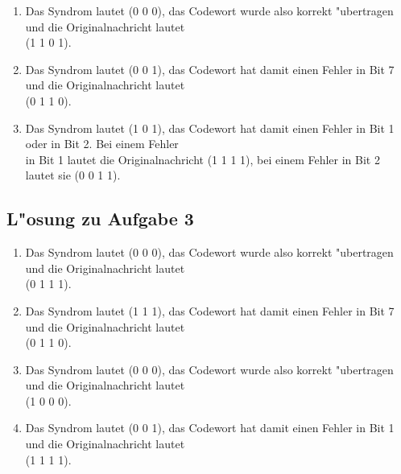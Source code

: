 \documentclass[10pt,oneside,onecolumn,a4paper,german,titlepage]{article}
\begin{document}
\begin{enumerate}
\item Das Syndrom lautet (0 0 0), das Codewort wurde also korrekt "ubertragen und
die Originalnachricht lautet\\
(1 1 0 1).
\item Das Syndrom lautet (0 0 1), das Codewort hat damit einen Fehler in Bit 7 und
die Originalnachricht lautet\\
(0 1 1 0).
\item Das Syndrom lautet (1 0 1), das Codewort hat damit einen Fehler in Bit 1 oder
in Bit 2. Bei einem Fehler\\
in Bit 1 lautet die Originalnachricht (1 1 1 1), bei einem Fehler in Bit 2 lautet
sie (0 0 1 1).
\end{enumerate}

\newpage

\subsection*{L"osung zu Aufgabe 3}
\begin{enumerate}
\item Das Syndrom lautet (0 0 0), das Codewort wurde also korrekt "ubertragen und
die Originalnachricht lautet\\
(0 1 1 1).
\item Das Syndrom lautet (1 1 1), das Codewort hat damit einen Fehler in Bit 7 und
die Originalnachricht lautet\\
(0 1 1 0).
\item Das Syndrom lautet (0 0 0), das Codewort wurde also korrekt "ubertragen und
die Originalnachricht lautet\\
(1 0 0 0).
\item Das Syndrom lautet (0 0 1), das Codewort hat damit einen Fehler in Bit 1 und
die Originalnachricht lautet\\
(1 1 1 1).
\end{enumerate}
\end{document}
